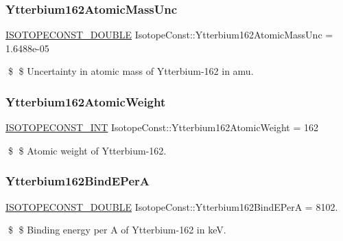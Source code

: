 \subsubsection{\texorpdfstring{Ytterbium162\+Atomic\+Mass\+Unc}{Ytterbium162AtomicMassUnc}}
{\footnotesize\ttfamily \mbox{\hyperlink{group___isotope_const-_macros_ga8f45a7272ce02c0b4c65c44636ed719a}{I\+S\+O\+T\+O\+P\+E\+C\+O\+N\+S\+T\+\_\+\+D\+O\+U\+B\+LE}} Isotope\+Const\+::\+Ytterbium162\+Atomic\+Mass\+Unc = 1.\+6488e-\/05}

\$ \$ Uncertainty in atomic mass of Ytterbium-\/162 in amu. \mbox{\label{group___isotope_const-_ytterbium-_yb162_ga127e4062e06c5508a230756d49dd4b26}} 
\subsubsection{\texorpdfstring{Ytterbium162\+Atomic\+Weight}{Ytterbium162AtomicWeight}}
{\footnotesize\ttfamily \mbox{\hyperlink{group___isotope_const-_macros_ga5f18360b3e99483a35c32d789e62621c}{I\+S\+O\+T\+O\+P\+E\+C\+O\+N\+S\+T\+\_\+\+I\+NT}} Isotope\+Const\+::\+Ytterbium162\+Atomic\+Weight = 162}

\$ \$ Atomic weight of Ytterbium-\/162. \mbox{\label{group___isotope_const-_ytterbium-_yb162_ga953de08f455f23897423d99c394d9a48}} 
\subsubsection{\texorpdfstring{Ytterbium162\+Bind\+E\+PerA}{Ytterbium162BindEPerA}}
{\footnotesize\ttfamily \mbox{\hyperlink{group___isotope_const-_macros_ga8f45a7272ce02c0b4c65c44636ed719a}{I\+S\+O\+T\+O\+P\+E\+C\+O\+N\+S\+T\+\_\+\+D\+O\+U\+B\+LE}} Isotope\+Const\+::\+Ytterbium162\+Bind\+E\+PerA = 8102.}

\$ \$ Binding energy per A of Ytterbium-\/162 in keV. \mbox{\label{group___isotope_const-_ytterbium-_yb162_ga373b56653d0e30d0dede9429f430666e}} 
